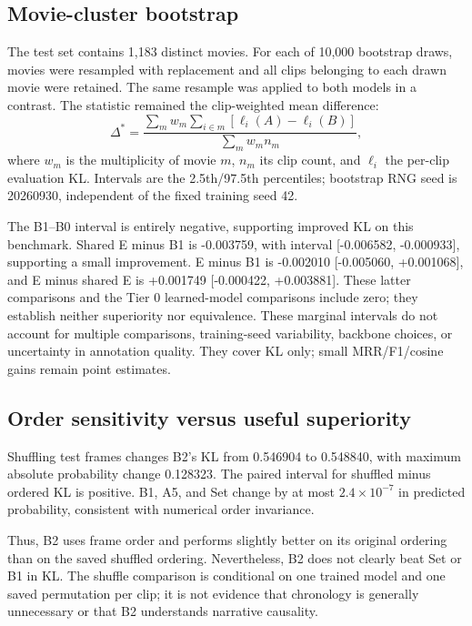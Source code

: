 \documentclass[11pt,a4paper]{article}
\newcommand{\tbl}[1]{\FloatBarrier}
\begin{document}
\subsection{Movie-cluster bootstrap}
The test set contains 1,183 distinct movies. For each of 10,000 bootstrap draws, movies were resampled with replacement and all clips belonging to each drawn movie were retained. The same resample was applied to both models in a contrast. The statistic remained the clip-weighted mean difference:
\begin{equation}
\Delta^*=\frac{\sum_m w_m\sum_{i\in m}\left[\ell_i(A)-\ell_i(B)\right]}{\sum_m w_m n_m},
\end{equation}
where $w_m$ is the multiplicity of movie $m$, $n_m$ its clip count, and $\ell_i$ the per-clip evaluation KL. Intervals are the 2.5th/97.5th percentiles; bootstrap RNG seed is 20260930, independent of the fixed training seed 42.
\tbl{bootstrap}

The B1--B0 interval is entirely negative, supporting improved KL on this benchmark. Shared E minus B1 is -0.003759, with interval [-0.006582, -0.000933], supporting a small improvement. E minus B1 is -0.002010 [-0.005060, +0.001068], and E minus shared E is +0.001749 [-0.000422, +0.003881]. These latter comparisons and the Tier 0 learned-model comparisons include zero; they establish neither superiority nor equivalence. These marginal intervals do not account for multiple comparisons, training-seed variability, backbone choices, or uncertainty in annotation quality. They cover KL only; small MRR/F1/cosine gains remain point estimates.

\subsection{Order sensitivity versus useful superiority}
Shuffling test frames changes B2's KL from 0.546904 to 0.548840, with maximum absolute probability change 0.128323. The paired interval for shuffled minus ordered KL is positive. B1, A5, and Set change by at most $2.4\times10^{-7}$ in predicted probability, consistent with numerical order invariance.

Thus, B2 uses frame order and performs slightly better on its original ordering than on the saved shuffled ordering. Nevertheless, B2 does not clearly beat Set or B1 in KL. The shuffle comparison is conditional on one trained model and one saved permutation per clip; it is not evidence that chronology is generally unnecessary or that B2 understands narrative causality.
\end{document}
